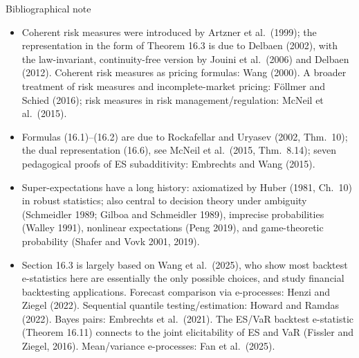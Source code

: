 \documentclass[aspectratio=169,10pt]{beamer}
\newcommand{\1}{\mathbb{1}}
\begin{document}
\begin{frame}{Bibliographical note}

\begin{itemize}
\item Coherent risk measures were introduced by Artzner et al.\ (1999); the representation in the form of Theorem 16.3 is due to Delbaen (2002), with the law-invariant, continuity-free version by Jouini et al.\ (2006) and Delbaen (2012). Coherent risk measures as pricing formulas: Wang (2000). A broader treatment of risk measures and incomplete-market pricing: F\"ollmer and Schied (2016); risk measures in risk management/regulation: McNeil et al.\ (2015).
\item Formulas (16.1)--(16.2) are due to Rockafellar and Uryasev (2002, Thm.\ 10); the dual representation (16.6), see McNeil et al.\ (2015, Thm.\ 8.14); seven pedagogical proofs of ES subadditivity: Embrechts and Wang (2015).
\item Super-expectations have a long history: axiomatized by Huber (1981, Ch.\ 10) in robust statistics; also central to decision theory under ambiguity (Schmeidler 1989; Gilboa and Schmeidler 1989), imprecise probabilities (Walley 1991), nonlinear expectations (Peng 2019), and game-theoretic probability (Shafer and Vovk 2001, 2019).
\item Section 16.3 is largely based on Wang et al.\ (2025), who show most backtest e-statistics here are essentially the only possible choices, and study financial backtesting applications. Forecast comparison via e-processes: Henzi and Ziegel (2022). Sequential quantile testing/estimation: Howard and Ramdas (2022). Bayes pairs: Embrechts et al.\ (2021). The ES/VaR backtest e-statistic (Theorem 16.11) connects to the joint elicitability of ES and VaR (Fissler and Ziegel, 2016). Mean/variance e-processes: Fan et al.\ (2025).
\end{itemize}

\end{frame}
\end{document}
